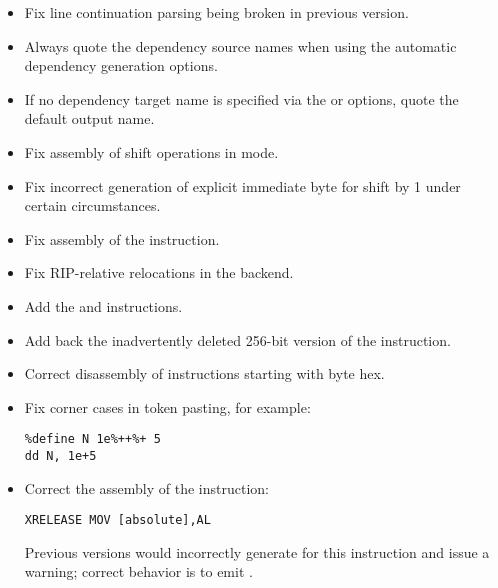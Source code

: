 
\begin{itemize}
    \item{Fix line continuation parsing being broken in previous version.}
\end{itemize}


\begin{itemize}
    \item{Always quote the dependency source names when using the automatic
        dependency generation options.}
    \item{If no dependency target name is specified via the  or
         options, quote the default output name.}
    \item{Fix assembly of shift operations in  mode.}
    \item{Fix incorrect generation of explicit immediate byte for shift by 1
        under certain circumstances.}
    \item{Fix assembly of the  instruction.}
    \item{Fix RIP-relative relocations in the  backend.}
\end{itemize}


\begin{itemize}
    \item{Add the  and  instructions.}
\end{itemize}


\begin{itemize}
    \item{Add back the inadvertently deleted 256-bit version of the  instruction.}
    \item{Correct disassembly of instructions starting with byte  hex.}
    \item{Fix corner cases in token pasting, for example:
\begin{lstlisting}
%define N 1e%++%+ 5
dd N, 1e+5
\end{lstlisting}}
\end{itemize}


\begin{itemize}
    \item{Correct the assembly of the instruction:
\begin{lstlisting}
XRELEASE MOV [absolute],AL
\end{lstlisting}
    Previous versions would incorrectly generate  for this
    instruction and issue a warning; correct behavior is to emit .}
\end{itemize}

